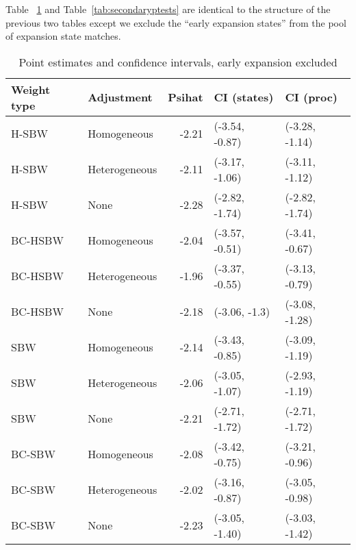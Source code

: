 Table ~\ref{tab:confintmainc2} and Table~\ref{tab:secondaryptests} are identical to the structure of the previous two tables except we exclude the ``early expansion states'' from the pool of expansion state matches. 

\begin{table}[ht]
\centering
\caption{Point estimates and confidence intervals, early expansion excluded}
\label{tab:confintmainc2}
\begin{tabular}{llrll}
  \hline
Weight type & Adjustment & Psihat & CI (states) & CI (proc) \\ 
  \hline
H-SBW & Homogeneous & -2.21 & (-3.54, -0.87) & (-3.28, -1.14) \\ 
  H-SBW & Heterogeneous & -2.11 & (-3.17, -1.06) & (-3.11, -1.12) \\ 
  H-SBW & None & -2.28 & (-2.82, -1.74) & (-2.82, -1.74) \\ 
  BC-HSBW & Homogeneous & -2.04 & (-3.57, -0.51) & (-3.41, -0.67) \\ 
  BC-HSBW & Heterogeneous & -1.96 & (-3.37, -0.55) & (-3.13, -0.79) \\ 
  BC-HSBW & None & -2.18 & (-3.06, -1.3) & (-3.08, -1.28) \\ 
  SBW & Homogeneous & -2.14 & (-3.43, -0.85) & (-3.09, -1.19) \\ 
  SBW & Heterogeneous & -2.06 & (-3.05, -1.07) & (-2.93, -1.19) \\ 
  SBW & None & -2.21 & (-2.71, -1.72) & (-2.71, -1.72) \\ 
  BC-SBW & Homogeneous & -2.08 & (-3.42, -0.75) & (-3.21, -0.96) \\ 
  BC-SBW & Heterogeneous & -2.02 & (-3.16, -0.87) & (-3.05, -0.98) \\ 
  BC-SBW & None & -2.23 & (-3.05, -1.40) & (-3.03, -1.42) \\ 
   \hline
\end{tabular}
\end{table}

